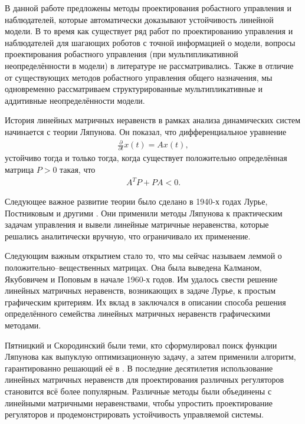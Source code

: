 В данной работе предложены методы проектирования робастного управления и наблюдателей, которые автоматически доказывают устойчивость линейной модели. В то время как существует ряд работ по проектированию управления и наблюдателей для шагающих роботов с точной информацией о модели, вопросы проектирования робастного управления (при мультипликативной неопределённости в модели) в литературе не рассматривались. Также в отличие от существующих методов робастного управления общего назначения, мы одновременно рассматриваем структурированные мультипликативные и аддитивные неопределённости модели.

{\progress}

История линейных матричных неравенств в рамках анализа динамических систем начинается с теории Ляпунова. Он показал, что дифференциальное уравнение
\begin{align*}
	\frac{\partial}{\partial t}x(t)=Ax(t),
\end{align*}
устойчиво тогда и только тогда, когда существует положительно определённая матрица $P > 0$ такая, что
\begin{align*}
	A^T P + P A < 0.
\end{align*}

Следующее важное развитие теории было сделано в 1940-х годах Лурье, Постниковым и другими \cite{LMI1}. 
Они применили методы Ляпунова к практическим задачам управления и вывели линейные матричные неравенства, которые решались аналитически вручную, что ограничивало их применение. 

Следующим важным открытием стало то, что мы сейчас называем леммой о положительно--вещественных матрицах. Она была выведена Калманом, Якубовичем и Поповым в начале 1960-х годов. Им удалось свести решение линейных матричных неравенств, возникающих в задаче Лурье, к простым графическим критериям. Их вклад в \cite{LMI2} заключался в описании способа решения определённого семейства линейных матричных неравенств графическими методами.

Пятницкий и Скородинский были теми, кто сформулировал поиск функции Ляпунова как выпуклую оптимизационную задачу, а затем применили алгоритм, гарантированно решающий её в \cite{LMI3}.
В последние десятилетия использование линейных матричных неравенств для проектирования различных регуляторов становится всё более популярным. Различные методы \cite{LMI4, LMI5} были объединены с линейными матричными неравенствами, чтобы упростить проектирование регуляторов и продемонстрировать устойчивость управляемой системы.

